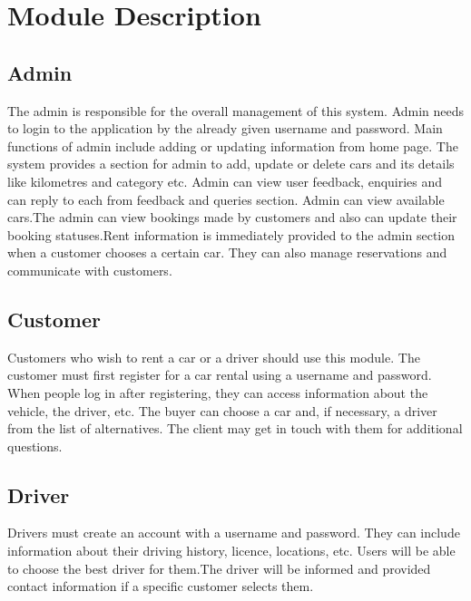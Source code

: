 \documentclass[a4paper,12pt,toc=flat]{report}
\begin{document}
{	           	\section{Module Description}
	           \vspace*{6pt} \subsection{Admin}
	           	\hspace*{12pt}The admin is responsible for the overall management of this system. Admin needs to login to the application by the already given username and password. Main functions of admin include adding or updating information from home page. The system provides a section for admin to add, update or delete cars and its details like kilometres and category etc. Admin can view user feedback, enquiries and can reply to each from feedback and queries section. Admin can view available cars.The admin can view bookings made by customers and also can update their booking statuses.Rent information is immediately provided to the admin section when a customer chooses a certain car. They can also manage reservations and communicate with customers.
	           	\\
		\subsection{Customer}
	           	\hspace*{12pt}Customers who wish to rent a car or a driver should use this module. The customer must first register for a car rental using a username and password. When people log in after registering, they can access information about the vehicle, the driver, etc. The buyer can choose a car and, if necessary, a driver from the list of alternatives. The client may get in touch with them for additional questions.
	           	\\
	   \subsection{Driver}
	            \hspace*{12pt}Drivers must create an account with a username and password. They can include information about their driving history, licence, locations, etc. Users will be able to choose the best driver for them.The driver will be informed and provided contact information if a specific customer selects them.
	           	\\
	           \\
}
\end{document}
